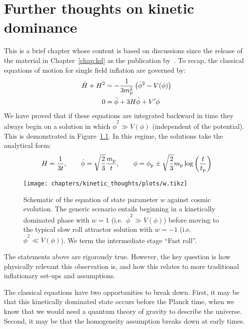 \chapter{Further thoughts on kinetic dominance}
\label{chap:kt}

This is a brief chapter whose content is based on discussions since the release of the material in Chapter~\ref{chap:kd} as the publication by~\cite{Handley+2014}.
To recap, the classical equations of motion for single field inflation are
governed by:
%
\begin{align}
  \dot{H} + H^2 
  &= - \frac{1}{3m_{\mathrm{p}}^2}\left( \dot{\phi}^2 - V(\phi)\right)
  \label{eqn:kt:raychaudhuri}
  \\
  0 &= \ddot{\phi} + 3H\dot\phi + V^\prime{\phi}
  \label{eqn:kt:kleingordon}
\end{align}
%
We have proved that if these equations are integrated backward in time
they always begin on a solution in which \(\dot\phi^2\gg V(\phi)\)
(independent of the potential). This is demonstrated in
Figure~\ref{fig:kt:w}. In this regime, the solutions take the analytical
form:
\begin{equation}
  H = \frac{1}{3t},\qquad \dot{\phi} 
  = \sqrt{\frac 2 3}\frac{m_{\mathrm{p}}}{t}, \qquad \phi 
  = \phi_{\mathrm{p}} \pm \sqrt{\frac 2 3}m_{\mathrm{p}} \log\left( \frac t {t_{\mathrm{p}}} \right)
\end{equation}
\begin{figure}[tp]
  \texttt{[image: chapters/kinetic\_thoughts/plots/w.tikz]}
  \caption{%
    Schematic of the equation of state parameter \(w\) against cosmic
    evolution. The generic scenario entails beginning in a kinetically
    dominated phase with \(w=1\) (i.e.\ \(\dot{\phi}^2\gg V(\phi)\))
    before moving to the typical slow roll attractor solution with
    \(w=-1\) (i.e.\ \(\dot{\phi}^2 \ll V(\phi)\)). We term the
    intermediate stage ``Fast roll''.\label{fig:kt:w}
  }
\end{figure}

The statements above are rigorously true. However, the key question is how physically relevant this observation is, and how this relates to more traditional inflationary set-ups and assumptions.

The classical equations have two opportunities to break down. First, it may be that this kinetically dominated state occurs before the Planck time, when we know that we would need a quantum theory of gravity to describe the universe. Second, it may be that the homogeneity assumption breaks down at early times.

